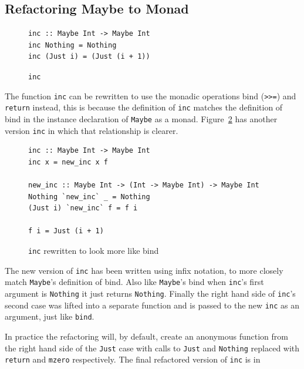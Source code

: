 \subsection{Refactoring Maybe to Monad}
\label{genMonad}

\texttt{} \texttt{} \texttt{}

\begin{figure}[t]
\DIFaddendFL \begin{lstlisting}
inc :: Maybe Int -> Maybe Int
inc Nothing = Nothing
inc (Just i) = (Just (i + 1))
\end{lstlisting}
\caption{\texttt{inc}}
\label{mmp1}
\end{figure}

The function \texttt{inc} \DIFaddbegin {}\DIFaddend can be rewritten to use the monadic operations bind (\texttt{>>=}) and \texttt{return} instead, this is because the definition of \texttt{inc} matches the definition of bind in the instance declaration of \texttt{Maybe} as a monad. Figure~\ref{incRewrite} has another version \texttt{inc} in which that relationship is clearer.

\begin{figure}[t]
\begin{lstlisting}
inc :: Maybe Int -> Maybe Int
inc x = new_inc x f

new_inc :: Maybe Int -> (Int -> Maybe Int) -> Maybe Int
Nothing `new_inc` _ = Nothing
(Just i) `new_inc` f = f i

f i = Just (i + 1)
\end{lstlisting}
\caption{\texttt{inc} rewritten to look more like bind}
\label{incRewrite}
\end{figure}

The new version of \texttt{inc} has been written using infix notation, to more closely match \texttt{Maybe}'s definition of bind. Also like \texttt{Maybe}'s bind when \texttt{inc}'s first argument is \texttt{Nothing} it just returns \texttt{Nothing}. Finally the right hand side of \texttt{inc}'s second case was lifted into a separate function and is passed to the new \texttt{inc} as an argument, just like \texttt{bind}.

In practice the refactoring will, by default, create an anonymous function from the right hand side of the \texttt{Just} case with calls to \texttt{Just} and \texttt{Nothing} replaced with \texttt{return} and \texttt{mzero} respectively. The final refactored version of \texttt{inc} is in \DIFdelbegin {}\DIFdelend \DIFaddbegin {}\DIFaddend 

